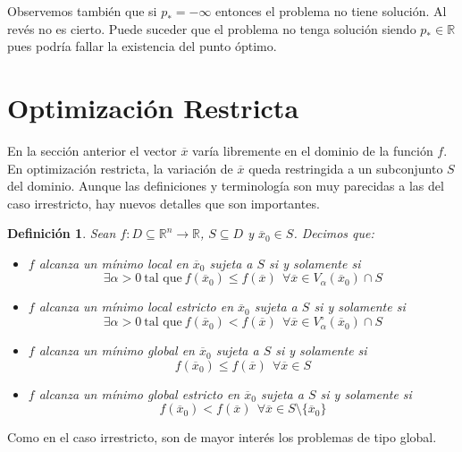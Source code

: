 \documentclass[11pt]{report}
\newtheorem{definition}{Definición}[section]
\newcommand{\Rn}{\mathbb{R}^{n}}
\newcommand{\R}{\mathbb{R}}
\newcommand{\x}{\overline{x}}
\newcommand{\xz}{\overline{x}_{0}}
\newcommand{\po}{p_{*}}
\begin{document}
Observemos también que si $\po=-\infty$ entonces el problema no tiene solución. Al revés no es cierto. Puede suceder que el problema no tenga solución siendo $\po\in\R$ pues podría fallar la existencia del punto óptimo.

\section{Optimización Restricta}

En la sección anterior el vector $\x$ varía libremente en el dominio de la función $f$. En optimización restricta, la variación de $\x$ queda restringida a un subconjunto $S$ del dominio. Aunque las definiciones y terminología son muy parecidas a las del caso irrestricto, hay nuevos detalles que son importantes.

\begin{definition}
Sean $f:D\subseteq\Rn\rightarrow\R$, $S\subseteq D$ y $\xz\in S$. Decimos que:
\begin{itemize}
\item[(i)] $f$ alcanza un mínimo local en $\xz$ sujeta a $S$ si y solamente si $$\exists\alpha >0\ \text{tal que}\ f(\xz)\leq f(\x)\ \ \forall\x\in V_{\alpha}(\xz)\cap S$$
\item[(ii)] $f$ alcanza un mínimo local estricto en $\xz$ sujeta a $S$ si y solamente si $$\exists\alpha >0\ \text{tal que}\ f(\xz)< f(\x)\ \ \forall\x\in V_{\alpha}^{\circ}(\xz)\cap S$$
\item[(iii)] $f$ alcanza un mínimo global en $\xz$ sujeta a $S$ si y solamente si $$f(\xz)\leq f(\x)\ \ \forall\x\in S$$
\item[(iv)] $f$ alcanza un mínimo global estricto en $\xz$ sujeta a $S$ si y solamente si $$f(\xz)< f(\x)\ \ \forall\x\in S\setminus{\{\xz\}}$$
\end{itemize}
\end{definition}

Como en el caso irrestricto, son de mayor interés los problemas de tipo global.
\end{document}
